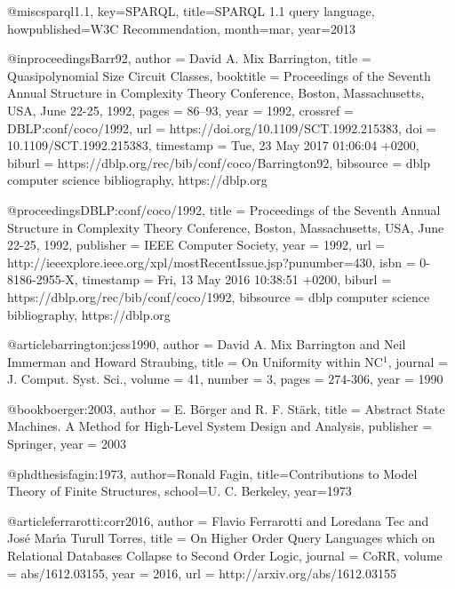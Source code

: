 \documentclass{article}
\begin{document}
@misc{sparql1.1,
  key={SPARQL},
title={{SPARQL} 1.1 query language},
howpublished={W3C Recommendation},
month=mar, year=2013}


@inproceedings{Barr92,
  author    = {David A. {Mix Barrington}},
  title     = {Quasipolynomial Size Circuit Classes},
  booktitle = {Proceedings of the Seventh Annual Structure in Complexity Theory Conference,
               Boston, Massachusetts, USA, June 22-25, 1992},
  pages     = {86--93},
  year      = {1992},
  crossref  = {DBLP:conf/coco/1992},
  url       = {https://doi.org/10.1109/SCT.1992.215383},
  doi       = {10.1109/SCT.1992.215383},
  timestamp = {Tue, 23 May 2017 01:06:04 +0200},
  biburl    = {https://dblp.org/rec/bib/conf/coco/Barrington92},
  bibsource = {dblp computer science bibliography, https://dblp.org}
}

@proceedings{DBLP:conf/coco/1992,
  title     = {Proceedings of the Seventh Annual Structure in Complexity Theory Conference,
               Boston, Massachusetts, USA, June 22-25, 1992},
  publisher = {{IEEE} Computer Society},
  year      = {1992},
  url       = {http://ieeexplore.ieee.org/xpl/mostRecentIssue.jsp?punumber=430},
  isbn      = {0-8186-2955-X},
  timestamp = {Fri, 13 May 2016 10:38:51 +0200},
  biburl    = {https://dblp.org/rec/bib/conf/coco/1992},
  bibsource = {dblp computer science bibliography, https://dblp.org}
}

@article{barrington:jcss1990,
  author    = {David A. {Mix Barrington} and
               Neil Immerman and
               Howard Straubing},
  title     = {On Uniformity within {NC}$^1$},
  journal   = {J. Comput. Syst. Sci.},
  volume    = {41},
  number    = {3},
  pages     = {274-306},
  year      = {1990}}
  
@book{boerger:2003,
  author = 	 {E. B{\"o}rger and R. F. St{\"a}rk},
  title = 	 {Abstract {S}tate {M}achines. A Method for High-Level System
Design and Analysis},
  publisher = 	 {Springer},
  year = 	 {2003}}

@phdthesis{fagin:1973,
author={Ronald Fagin},
title={Contributions to Model Theory of Finite Structures},
school={U. C. Berkeley},
year={1973}}

@article{ferrarotti:corr2016,
  author    = {Flavio Ferrarotti and
               Loredana Tec and
               Jos{\'{e}} Mar\'{\i}a {Turull Torres}},
  title     = {On Higher Order Query Languages which on Relational Databases Collapse
               to Second Order Logic},
  journal   = {CoRR},
  volume    = {abs/1612.03155},
  year      = {2016},
  url       = {http://arxiv.org/abs/1612.03155}}
\end{document}
